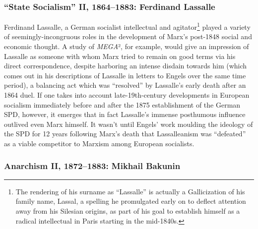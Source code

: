 
\subsubsection{``State Socialism'' II, 1864--1883: Ferdinand Lassalle\label{sec:lassalle}}

Ferdinand Lassalle, a German socialist intellectual and agitator\footnote{The rendering of his surname as ``Lassalle'' is actually a Gallicization of his family name, Lassal, a spelling he promulgated early on to deflect attention away from his Silesian origins, as part of his goal to establish himself as a radical intellectual in Paris starting in the mid-1840s.} played a variety of seemingly-incongruous roles in the development of Marx's post-1848 social and economic thought. A study of \textit{MEGA}², for example, would give an impression of Lassalle as someone with whom Marx tried to remain on good terms via his direct correspondence, despite harboring an intense disdain towards him (which comes out in his descriptions of Lassalle in letters to Engels over the same time period), a balancing act which was ``resolved'' by Lassalle's early death after an 1864 duel. If one takes into account late-19th-century developments in European socialism immediately before and after the 1875 establishment of the German SPD, however, it emerges that in fact Lassalle's immense posthumous influence outlived even Marx himself. It wasn't until Engels' work moulding the ideology of the SPD for 12 years following Marx's death that Lassalleanism was ``defeated'' as a viable competitor to Marxism among European socialists.


\subsubsection{Anarchism II, 1872--1883: Mikhail Bakunin\label{sec:bakunin}}


